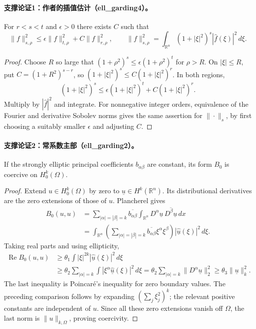 \documentclass[UTF8,11pt]{ctexart}
\theoremstyle{definition}
\begin{document}
\paragraph{支撑论证1：作者的插值估计（ell\_garding4）。}
For $r<s<t$ and $\epsilon>0$ there exists $C$ such that
\[
\|f\|_{s,\rho}^2\leq\epsilon\|f\|_{t,\rho}^2+C\|f\|_{r,\rho}^2,
\qquad \|f\|_{s,\rho}^2=\int_{\mathbb R^n}(1+|\xi|^2)^s|\widehat f(\xi)|^2\,d\xi.
\]
\begin{proof}
Choose $R$ so large that $(1+\rho^2)^s\leq\epsilon(1+\rho^2)^t$ for
$\rho>R$. On $|\xi|\leq R$, put $C=(1+R^2)^{s-r}$, so
$(1+|\xi|^2)^s\leq C(1+|\xi|^2)^r$.
In both regions,
\[
(1+|\xi|^2)^s\leq\epsilon(1+|\xi|^2)^t+C(1+|\xi|^2)^r.
\]
Multiply by $|\widehat f|^2$ and integrate. For nonnegative integer
orders, equivalence of the Fourier and derivative Sobolev norms gives
the same assertion for $\|\cdot\|_s$, by first choosing a suitably
smaller $\epsilon$ and adjusting $C$.
\end{proof}
\paragraph{支撑论证2：常系数主部（ell\_garding2）。}
If the strongly elliptic principal coefficients $b_{\alpha\beta}$ are
constant, its form $B_0$ is coercive on $H^k_0(\Omega)$.
\begin{proof}
Extend $u\in H^k_0(\Omega)$ by zero to $\underline u\in H^k(\mathbb R^n)$.
Its distributional derivatives are the zero extensions of those of $u$.
Plancherel gives
\begin{align*}
B_0(u,u)
&=\sum_{|\alpha|=|\beta|=k}\overline{b_{\alpha\beta}}
  \int_{\mathbb R^n}D^\alpha\underline u\,
              \overline{D^\beta\underline u}\,dx\\
&=\int_{\mathbb R^n}
 \left(\sum_{|\alpha|=|\beta|=k}\overline{b_{\alpha\beta}}\xi^\alpha\xi^\beta\right)
 |\widehat{\underline u}(\xi)|^2\,d\xi.
\end{align*}
Taking real parts and using ellipticity,
\begin{align*}
\operatorname{Re}B_0(u,u)
&\geq\theta_1\int |\xi|^{2k}|\widehat{\underline u}(\xi)|^2\,d\xi\\
&\geq\theta_2\sum_{|\alpha|=k}\int
 |\xi^\alpha\widehat{\underline u}(\xi)|^2\,d\xi
=\theta_2\sum_{|\alpha|=k}\|D^\alpha\underline u\|_2^2
\geq\theta_3\|\underline u\|_k^2.
\end{align*}
The last inequality is Poincar\'e's inequality for zero boundary values.
The preceding comparison follows by expanding $(\sum_j\xi_j^2)^k$;
the relevant positive constants are independent of $u$.
Since all these zero extensions vanish off $\Omega$, the last norm
is $\|u\|_{k,\Omega}$, proving coercivity.
\end{proof}
\end{document}
